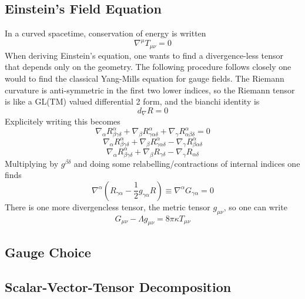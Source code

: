 \subsection{Einstein's Field Equation}
In a curved spacetime, conservation of energy is written
\begin{equation}
	\nabla^\mu T_{\mu\nu} = 0
\end{equation}
When deriving Einstein's equation, one wants to find a divergence-less tensor that depends only on the geometry. The following procedure follows closely one would to find the classical Yang-Mills equation for gauge fields. The Riemann curvature is anti-symmetric in the first two lower indices, so the Riemann tensor is like a GL(TM) valued differential 2 form, and the bianchi identity is
\begin{equation}
	d_{\nabla} R = 0
\end{equation}
Explicitely writing this becomes
\[ \nabla_{\alpha} R^{\alpha}_{\beta\gamma\delta} + \nabla_{\beta}R^{\alpha}_{\gamma\alpha\delta} + \nabla_{\gamma}R^{\alpha}_{\alpha\beta\delta} = 0 \]
\[ \nabla_{\alpha} R^{\alpha}_{\beta\gamma\delta} + \nabla_{\beta}R^{\alpha}_{\gamma\alpha\delta} - \nabla_{\gamma}R^{\alpha}_{\beta\alpha\delta} \]
\[ \nabla_{\alpha}R^{\alpha}_{\beta\gamma\delta} + \nabla_{\beta}R_{\gamma\delta} - \nabla_{\gamma}R_{\alpha\delta} \]
Multiplying by $g^{\beta\delta}$ and doing some relabelling/contractions of internal indices one finds
\begin{equation}
	\nabla^\alpha(R_{\gamma\alpha}-\frac{1}{2}g_{\gamma\alpha}R) \equiv \nabla^{\alpha}G_{\gamma\alpha} = 0
\end{equation}
There is one more divergencless tensor, the metric tensor $g_{\mu\nu}$, so one can write
\begin{equation}
	G_{\mu\nu} - \Lambda g_{\mu\nu} = 8\pi\kappa T_{\mu\nu}
\end{equation}

\subsection{Gauge Choice}
\subsection{Scalar-Vector-Tensor Decomposition}

